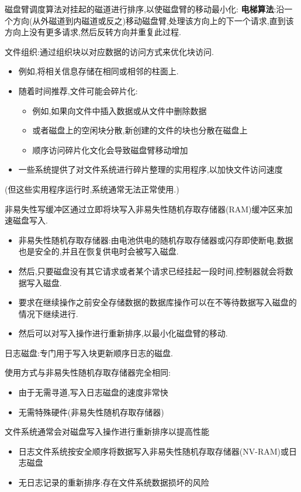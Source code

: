 磁盘臂调度算法对挂起的磁道进行排序,以使磁盘臂的移动最小化:
\textbf{电梯算法}:沿一个方向(从外磁道到内磁道或反之)移动磁盘臂,处理该方向上的下一个请求,直到该方向上没有更多请求,然后反转方向并重复此过程.

文件组织:通过组织块以对应数据的访问方式来优化块访问.

\begin{itemize}
    \item 例如,将相关信息存储在相同或相邻的柱面上.
    \item 随着时间推荐,文件可能会碎片化:
       \begin{itemize}
           \item 例如,如果向文件中插入数据或从文件中删除数据
           \item 或者磁盘上的空闲块分散,新创建的文件的块也分散在磁盘上
           \item 顺序访问碎片化文化会导致磁盘臂移动增加
       \end{itemize}  
    \item 一些系统提供了对文件系统进行碎片整理的实用程序,以加快文件访问速度
\end{itemize}
(但这些实用程序运行时,系统通常无法正常使用.)

非易失性写缓冲区通过立即将块写入非易失性随机存取存储器(RAM)缓冲区来加速磁盘写入.

\begin{itemize}
    \item 非易失性随机存取存储器:由电池供电的随机存取存储器或闪存即使断电,数据也是安全的,并且在恢复供电时会被写入磁盘.
    \item 然后,只要磁盘没有其它请求或者某个请求已经挂起一段时间,控制器就会将数据写入磁盘.
    \item 要求在继续操作之前安全存储数据的数据库操作可以在不等待数据写入磁盘的情况下继续进行.
    \item 然后可以对写入操作进行重新排序,以最小化磁盘臂的移动.
\end{itemize}

日志磁盘:专门用于写入块更新顺序日志的磁盘.

使用方式与非易失性随机存取存储器完全相同:

\begin{itemize}
    \item 由于无需寻道,写入日志磁盘的速度非常快
    \item 无需特殊硬件(非易失性随机存取存储器)
\end{itemize}

文件系统通常会对磁盘写入操作进行重新排序以提高性能

\begin{itemize}
    \item 日志文件系统按安全顺序将数据写入非易失性随机存取存储器(NV-RAM)或日志磁盘
    \item 无日志记录的重新排序:存在文件系统数据损坏的风险
\end{itemize}